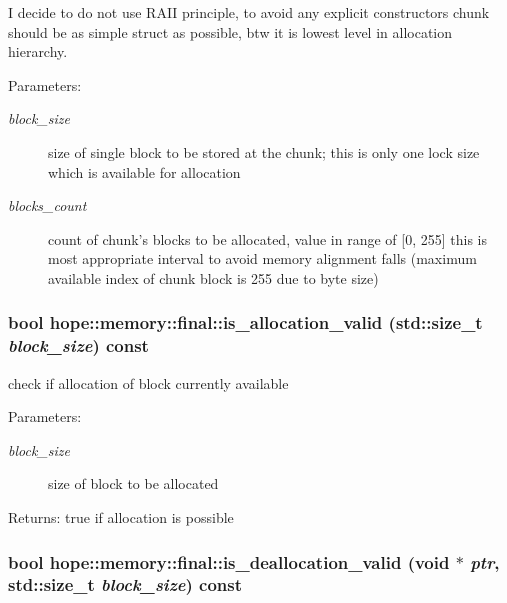 I decide to do not use RAII principle, to avoid any explicit constructors chunk should be as simple struct as possible, btw it is lowest level in allocation hierarchy. 

\begin{Desc}
\item[Parameters:]
\begin{description}
\item[{\em block\_\-size}]size of single block to be stored at the chunk; this is only one lock size which is available for allocation \item[{\em blocks\_\-count}]count of chunk's blocks to be allocated, value in range of \mbox{[}0, 255\mbox{]} this is most appropriate interval to avoid memory alignment falls (maximum available index of chunk block is 255 due to byte size) \end{description}
\end{Desc}
\hypertarget{structhope_1_1memory_1_1final_44c5aa574f7dea1a3689fdb6e1215bf1}{
\subsubsection[{is\_\-allocation\_\-valid}]{\setlength{\rightskip}{0pt plus 5cm}bool hope::memory::final::is\_\-allocation\_\-valid (std::size\_\-t {\em block\_\-size}) const}}
\label{structhope_1_1memory_1_1final_44c5aa574f7dea1a3689fdb6e1215bf1}


check if allocation of block currently available 

\begin{Desc}
\item[Parameters:]
\begin{description}
\item[{\em block\_\-size}]size of block to be allocated \end{description}
\end{Desc}
\begin{Desc}
\item[Returns:]true if allocation is possible \end{Desc}
\hypertarget{structhope_1_1memory_1_1final_180904dab84e90547c6664815c449416}{
\subsubsection[{is\_\-deallocation\_\-valid}]{\setlength{\rightskip}{0pt plus 5cm}bool hope::memory::final::is\_\-deallocation\_\-valid (void $\ast$ {\em ptr}, \/  std::size\_\-t {\em block\_\-size}) const}}
\label{structhope_1_1memory_1_1final_180904dab84e90547c6664815c449416}


